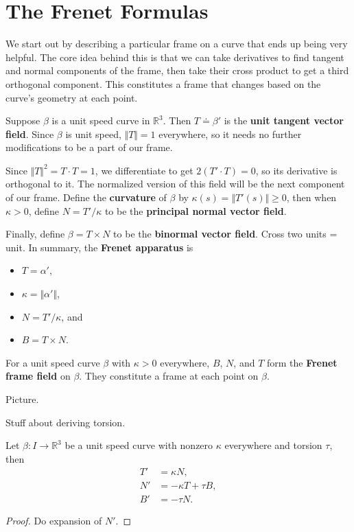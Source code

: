 \documentclass[10pt]{report}
\begin{document}

\section{The Frenet Formulas}

We start out by describing a particular frame on a curve that ends up being very helpful. The core idea behind this is that we can take derivatives to find tangent and normal components of the frame, then take their cross product to get a third orthogonal component. This constitutes a frame that changes based on the curve's geometry at each point.

Suppose $\beta$ is a unit speed curve in $\mathbb{R}^3$. Then $T\doteq\beta'$ is the \textbf{unit tangent vector field}. Since $\beta$ is unit speed, $\Vert{T}\Vert=1$ everywhere, so it needs no further modifications to be a part of our frame.

Since $\Vert{T}\Vert^2 = T\cdot T=1$, we differentiate to get $2(T'\cdot T)=0$, so its derivative is orthogonal to it. The normalized version of this field will be the next component of our frame. Define the \textbf{curvature} of $\beta$ by $\kappa(s) = \Vert{T'(s)}\Vert\geq 0$, then when $\kappa > 0$, define $N = T' / \kappa$ to be the \textbf{principal normal vector field}.

Finally, define $\beta = T \times N$ to be the \textbf{binormal vector field}. {\color{red}Cross two units = unit.} In summary, the \textbf{Frenet apparatus} is
\begin{itemize}
	\item $T=\alpha'$,
	\item $\kappa = \Vert{\alpha'}\Vert$,
	\item $N = T' / \kappa$, and
	\item $B = T \times N$.
\end{itemize}
\begin{defn}[]
	For a unit speed curve $\beta$ with $\kappa>0$ everywhere, $B$, $N$, and $T$ form the \textbf{Frenet frame field} on $\beta$. They constitute a frame at each point on $\beta$.
\end{defn}

{\color{red}Picture.}

{\color{red}Stuff about deriving torsion.}

\begin{thrm}
Let $\beta:I \to \mathbb{R}^3$ be a unit speed curve with nonzero $\kappa$ everywhere and torsion $\tau$, then
\begin{align*}
	T' &= \kappa N, \\
	N' &= -\kappa T + \tau B, \\
	B' &= -\tau N.
\end{align*}
\end{thrm}
\begin{proof}
	{\color{red}Do expansion of $N'$.}
\end{proof}
\end{document}
